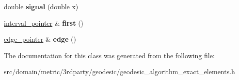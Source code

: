 \begin{DoxyCompactItemize}
\item 
\hypertarget{classgeodesic_1_1_interval_list_ab182b06304c4a422daf9d66850046180}{}double {\bfseries signal} (double x)\label{classgeodesic_1_1_interval_list_ab182b06304c4a422daf9d66850046180}

\item 
\hypertarget{classgeodesic_1_1_interval_list_a39c74d06d5952ef1ea196c89820e81c3}{}\hyperlink{classgeodesic_1_1_interval}{interval\+\_\+pointer} \& {\bfseries first} ()\label{classgeodesic_1_1_interval_list_a39c74d06d5952ef1ea196c89820e81c3}

\item 
\hypertarget{classgeodesic_1_1_interval_list_af3d71b5e687ae7f3890e855be978426c}{}\hyperlink{classgeodesic_1_1_edge}{edge\+\_\+pointer} \& {\bfseries edge} ()\label{classgeodesic_1_1_interval_list_af3d71b5e687ae7f3890e855be978426c}

\end{DoxyCompactItemize}


The documentation for this class was generated from the following file\+:\begin{DoxyCompactItemize}
\item 
src/domain/metric/3rdparty/geodesic/geodesic\+\_\+algorithm\+\_\+exact\+\_\+elements.\+h\end{DoxyCompactItemize}

